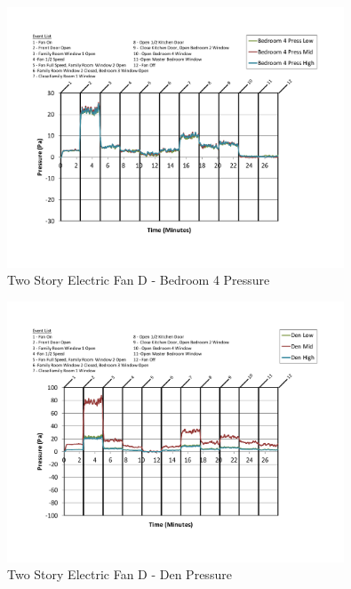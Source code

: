 \documentclass{article}
\begin{document}
\begin{appendices}
	\begin{figure}[H]
		\centering
		\includegraphics[height=3.05in,trim=0.67in 1.1in 0.67in 0.8in,clip=true]{0_Images/Results_Charts/ColdFlow/Two_Story/Electric/D/Bedroom_4_Pressure.pdf}
		\caption{Two Story Electric Fan D - Bedroom 4 Pressure}
	\end{figure}
 

	\begin{figure}[H]
		\centering
		\includegraphics[height=3.05in,trim=0.67in 1.1in 0.67in 0.8in,clip=true]{0_Images/Results_Charts/ColdFlow/Two_Story/Electric/D/Den_Pressure.pdf}
		\caption{Two Story Electric Fan D - Den Pressure}
	\end{figure}
 
	\clearpage


\end{appendices}
\end{document}
